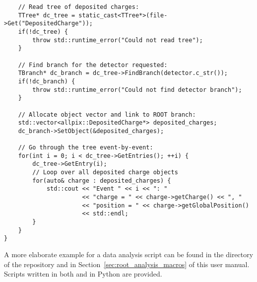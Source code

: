 \begin{description}
\begin{verbatim}
    // Read tree of deposited charges:
    TTree* dc_tree = static_cast<TTree*>(file->Get("DepositedCharge"));
    if(!dc_tree) {
        throw std::runtime_error("Could not read tree");
    }

    // Find branch for the detector requested:
    TBranch* dc_branch = dc_tree->FindBranch(detector.c_str());
    if(!dc_branch) {
        throw std::runtime_error("Could not find detector branch");
    }

    // Allocate object vector and link to ROOT branch:
    std::vector<allpix::DepositedCharge*> deposited_charges;
    dc_branch->SetObject(&deposited_charges);

    // Go through the tree event-by-event:
    for(int i = 0; i < dc_tree->GetEntries(); ++i) {
        dc_tree->GetEntry(i);
        // Loop over all deposited charge objects
        for(auto& charge : deposited_charges) {
            std::cout << "Event " << i << ": "
                      << "charge = " << charge->getCharge() << ", "
                      << "position = " << charge->getGlobalPosition()
                      << std::endl;
        }
    }
}

\end{verbatim}
A more elaborate example for a data analysis script can be found in the  directory of the repository and in Section~\ref{sec:root_analysis_macros} of this user manual.
Scripts written in both \CPP and in Python are provided.

\end{description}

